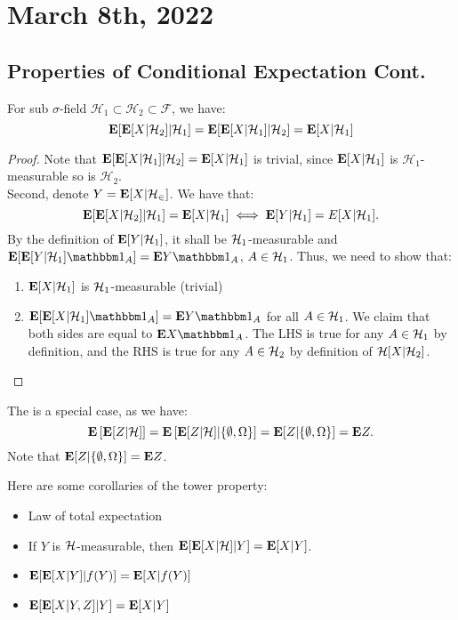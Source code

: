 \documentclass[../main/main.tex]{subfiles}
\begin{document}
\section{March 8th, 2022}
\subsection{Properties of Conditional Expectation Cont.}
\begin{definition}
	For sub $\sigma$-field $\mathcal{H}_1 \subset \mathcal{H}_2 \subset \mathscr{F}$, we have: \[
		\text{\textbf{E}}[\text{\textbf{E}}[X| \mathcal{H}_2]|\mathcal{H}_1] = \text{\textbf{E}} [\text{\textbf{E}}[X|\mathcal{H}_1]|\mathcal{H}_2] = \text{\textbf{E}}[X | \mathcal{H}_1]
	\]
\end{definition}
\begin{proof}
	Note that $\text{\textbf{E}} [\text{\textbf{E}}[X|\mathcal{H}_1]|\mathcal{H}_2] = \text{\textbf{E}}[X | \mathcal{H}_1]$ is trivial, since $\text{\textbf{E}}[X |\mathcal{H}_1]$ is $\mathcal{H}_1$-measurable so is $\mathcal{H}_2$.\\

	Second, denote $Y = \text{\textbf{E}}[X | \mathcal{H_2}]$. We have that:\[
		\text{\textbf{E}}[\text{\textbf{E}}[X| \mathcal{H}_2]|\mathcal{H}_1] = \text{\textbf{E}}[X | \mathcal{H}_1] \iff \text{\textbf{E}}[Y | \mathcal{H}_1] = E[X | \mathcal{H}_1].
	\]
	By the definition of $\text{\textbf{E}}[Y | \mathcal{H}_1]$, it shall be $\mathcal{H}_1$-measurable and $\E[\E[Y | \H_1] \ind_A] = \E Y \ind_A$, $A \in \mathcal{H}_1$. Thus, we need to show that:
	\begin{enumerate}
		\item $\text{\textbf{E}}[X | \mathcal{H}_1]$ is $\mathcal{H}_1$-measurable (trivial)
		\item $\E[\E[X|\H_1]\ind_A] = \E Y \ind_A$ for all $A \in \mathcal{H}_1$. We claim that both sides are equal to $\E X \ind_A$. The LHS is true for any $A \in \mathcal{H}_1$ by definition, and the RHS is true for any $A \in \mathcal{H}_2$ by definition of $\mathcal{H}[X | \mathcal{H}_2]$.
	\end{enumerate}
\end{proof}
\begin{example} The  is a special case, as we have: \[
		\text{\textbf{E}} \left[ \text{\textbf{E}} [Z | \mathcal{H}] \right] = \text{\textbf{E}} \left[ \text{\textbf{E}} [ Z | \mathcal{H}]  | \{\emptyset, \Omega \}\right] = \text{\textbf{E}}[Z | \{\emptyset, \Omega\}] = \text{\textbf{E}} Z. \]
	Note that $\text{\textbf{E}}[Z | \{\emptyset , \Omega\}] = \text{\textbf{E}} Z$.
\end{example}
\begin{corollary} Here are some corollaries of the tower property:
	\begin{itemize}
		\item Law of total expectation
		\item If $Y$ is $\mathcal{H}$-measurable, then $\text{\textbf{E}}[\text{\textbf{E}}[X | \mathcal{H}] | Y] = \text{\textbf{E}}[X | Y]$.
		\item $\text{\textbf{E}}[\text{\textbf{E}}[X | Y] | f(Y)] = \text{\textbf{E}}[X | f(Y)]$
		\item $\text{\textbf{E}}[\text{\textbf{E}}[X | Y,Z] |Y] = \text{\textbf{E}}[X |Y]$
	\end{itemize}
\end{corollary}
\end{document}
